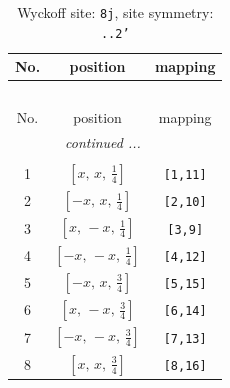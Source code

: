 \documentclass[fleqn,8pt]{jsarticle}
\begin{document}
\begin{longtable}{ccc}
\caption{Wyckoff site: {\tt 8j}, site symmetry: {\tt ..2'}}
 \\
 \hline \hline
No. & position & mapping \\ \hline \endfirsthead

\multicolumn{2}{l}{\tablename\ \thetable{}} \\
 \hline \hline
No. & position & mapping \\ \hline \endhead

 \hline \hline
\multicolumn{2}{r}{\footnotesize\it continued ...} \\ \endfoot

 \hline \hline
\multicolumn{2}{r}{} \\ \endlastfoot

1 & $\left[ x,\, x,\, \frac{1}{4} \right]$ & {\tt [1,11]} \\ \hline
2 & $\left[ - x,\, x,\, \frac{1}{4} \right]$ & {\tt [2,10]} \\ \hline
3 & $\left[ x,\, - x,\, \frac{1}{4} \right]$ & {\tt [3,9]} \\ \hline
4 & $\left[ - x,\, - x,\, \frac{1}{4} \right]$ & {\tt [4,12]} \\ \hline
5 & $\left[ - x,\, x,\, \frac{3}{4} \right]$ & {\tt [5,15]} \\ \hline
6 & $\left[ x,\, - x,\, \frac{3}{4} \right]$ & {\tt [6,14]} \\ \hline
7 & $\left[ - x,\, - x,\, \frac{3}{4} \right]$ & {\tt [7,13]} \\ \hline
8 & $\left[ x,\, x,\, \frac{3}{4} \right]$ & {\tt [8,16]} \\
\end{longtable}
\renewcommand{\arraystretch}{1.2}
\end{document}
